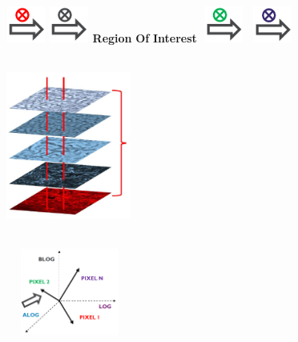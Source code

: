 \documentclass[portrait,final,a0paper]{baposter}
\begin{document}
\begin{poster}
{\begin{minipage}{.15\textwidth}
		\end{minipage}
		\begin{minipage}{.10\textwidth}
			\includegraphics[width=1.3cm, height=1.2cm]{convolution1}
			\includegraphics[width=1.3cm, height=1.2cm]{convolution2}
			\newline 
			\color{primary1}\textbf{Region}
			\newline 
			\color{primary1} \hspace{0.3cm}\textbf{Of}
			\newline
			\textbf{Interest}
			\includegraphics[width=1.5cm, height=1.2cm]{convolution3}
			\includegraphics[width=1.5cm, height=1.2cm]{convolution4}
		\end{minipage}
        \begin{minipage}{.28\textwidth}
        	\includegraphics[width=4.1cm, height=5.8cm]{filteredImage}	
        \end{minipage}
        \begin{minipage}{.30\textwidth}
        	\includegraphics[width=4.2cm, height=2.9cm]{vector}	

\end{minipage}}
\end{poster}
\end{document}
